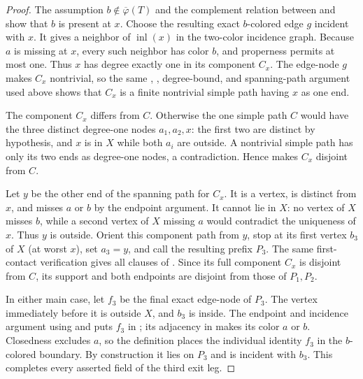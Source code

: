 \begin{proof}
The assumption $b\notin\overline\varphi(T)$ and the complement relation
between  and  show that
$b$ is present at $x$.  Choose the resulting exact $b$-colored edge $g$
incident with $x$.  It gives a neighbor of $\operatorname{inl}(x)$ in the
two-color incidence graph.  Because $a$ is missing at $x$, every such
neighbor has color $b$, and properness permits at most one.  Thus $x$ has
degree exactly one in its component $C_x$.  The edge-node $g$ makes
$C_x$ nontrivial, so the same
,
, degree-bound, and spanning-path
argument used above shows that $C_x$ is a finite nontrivial simple path
having $x$ as one end.

The component $C_x$ differs from $C$.  Otherwise the one simple path $C$
would have the three distinct degree-one nodes $a_1,a_2,x$: the first two
are distinct by hypothesis, and $x$ is in $X$ while both $a_i$ are outside.
A nontrivial simple path has only its two ends as degree-one nodes, a
contradiction.  Hence  makes $C_x$
disjoint from $C$.

Let $y$ be the other end of the spanning path for $C_x$.  It is a vertex,
is distinct from $x$, and misses $a$ or $b$ by the endpoint argument.  It
cannot lie in $X$: no vertex of $X$ misses $b$, while a second vertex of
$X$ missing $a$ would contradict the uniqueness of $x$.  Thus $y$ is
outside.  Orient this component path from $y$, stop at its first vertex
$b_3$ of $X$ (at worst $x$), set $a_3=y$, and call the resulting prefix
$P_3$.  The same first-contact verification gives all clauses of
.  Since its full component $C_x$ is disjoint from
$C$, its support and both endpoints are disjoint from those of $P_1,P_2$.

In either main case, let $f_3$ be the final exact edge-node of $P_3$.
The vertex immediately before it is outside $X$, and $b_3$ is inside.
The endpoint and incidence argument using  and
 puts $f_3$ in ; its
adjacency in  makes its color $a$ or $b$.
Closedness excludes $a$, so the definition
 places the individual identity $f_3$ in the
$b$-colored boundary.  By construction it lies on $P_3$ and is incident
with $b_3$.  This completes every asserted field of the third exit leg.
\end{proof}
